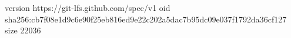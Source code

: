 version https://git-lfs.github.com/spec/v1
oid sha256:cb7f08e1d9c6e90f25eb816ed9e22c202a5dac7b95dc09e037f1792da36cf127
size 22036
